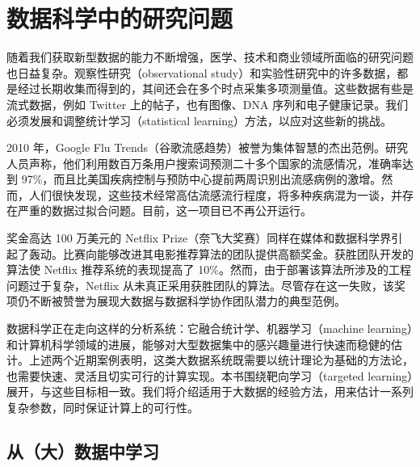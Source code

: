 \chapter{数据科学中的研究问题}
\label{ch:research-questions-data-science}

随着我们获取新型数据的能力不断增强，医学、技术和商业领域所面临的研究问题也日益复杂。观察性研究（observational study）和实验性研究中的许多数据，都是经过长期收集而得到的，其间还会在多个时点采集多项测量值。这些数据有些是流式数据，例如 Twitter 上的帖子，也有图像、DNA 序列和电子健康记录。我们必须发展和调整统计学习（statistical learning）方法，以应对这些新的挑战。

2010 年，Google Flu Trends（谷歌流感趋势）被誉为集体智慧的杰出范例。研究人员声称，他们利用数百万条用户搜索词预测二十多个国家的流感情况，准确率达到 97\%，而且比美国疾病控制与预防中心提前两周识别出流感病例的激增。然而，人们很快发现，这些技术经常高估流感流行程度，将多种疾病混为一谈，并存在严重的数据过拟合问题。目前，这一项目已不再公开运行。

奖金高达 100 万美元的 Netflix Prize（奈飞大奖赛）同样在媒体和数据科学界引起了轰动。比赛向能够改进其电影推荐算法的团队提供高额奖金。获胜团队开发的算法使 Netflix 推荐系统的表现提高了 10\%。然而，由于部署该算法所涉及的工程问题过于复杂，Netflix 从未真正采用获胜团队的算法。尽管存在这一失败，该奖项仍不断被赞誉为展现大数据与数据科学协作团队潜力的典型范例。

数据科学正在走向这样的分析系统：它融合统计学、机器学习（machine learning）和计算机科学领域的进展，能够对大型数据集中的感兴趣量进行快速而稳健的估计。上述两个近期案例表明，这类大数据系统既需要以统计理论为基础的方法论，也需要快速、灵活且切实可行的计算实现。本书围绕靶向学习（targeted learning）展开，与这些目标相一致。我们将介绍适用于大数据的经验方法，用来估计一系列复杂参数，同时保证计算上的可行性。

\section{从（大）数据中学习}
\label{sec:ch01-learning-from-data}

